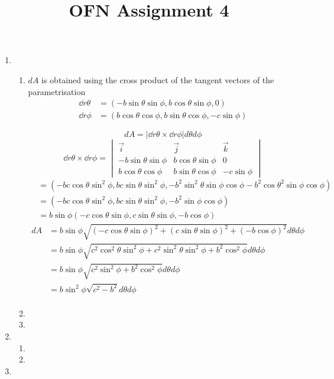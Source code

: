 \documentclass{X:/Documents/Coding/Latex/myassignment}
\title{OFN Assignment 4}
\begin{document}

\maketitle

\begin{enumerate}
\item 
\begin{enumerate}
	\item $dA$ is obtained using the cross product of the tangent vectors of the parametrisation
	\begin{align*}
		\dd r\theta &= \left(-b\sin\theta \sin\phi, b\cos\theta\sin\phi,0\right)\\
		\dd r\phi &= \left(b\cos\theta\cos\phi, b\sin\theta\cos\phi,-c\sin\phi\right)
	\end{align*}

	\[dA = \left|\dd r\theta \times \dd r\phi \right| d\theta d\phi\]
	\[\dd r\theta \times \dd r\phi= \begin{vmatrix}
		\vec i & \vec j & \vec k \\
		-b\sin\theta \sin\phi& b\cos\theta\sin\phi&0\\
		b\cos\theta\cos\phi& b\sin\theta\cos\phi&-c\sin\phi
	\end{vmatrix}\]
	\begin{align*}
		&= \left(-bc\cos\theta\sin^2\phi, bc\sin\theta\sin^2\phi, -b^2\sin^2\theta\sin\phi\cos\phi - b^2\cos\theta^2\sin\phi\cos\phi\right)\\
		&=\left(-bc\cos\theta\sin^2\phi, bc\sin\theta\sin^2\phi, -b^2\sin\phi\cos\phi\right) \\
		&= b\sin\phi\left(-c\cos\theta\sin\phi, c\sin\theta\sin\phi, -b\cos\phi\right) 
	\end{align*}
	\begin{align*}
		dA &= b\sin\phi\sqrt{(-c\cos\theta\sin\phi)^2 + (c\sin\theta\sin\phi)^2 + (-b\cos\phi)^2} d\theta d\phi\\
		&= b\sin\phi\sqrt{c^2\cos^2\theta\sin^2\phi + c^2\sin^2\theta\sin^2\phi + b^2\cos^2\phi} d\theta d\phi\\
		&= b\sin\phi\sqrt{c^2\sin^2\phi + b^2\cos^2\phi} d\theta d\phi\\
		&= b\sin^2\phi\sqrt{c^2-b^2} d\theta d\phi\\
	\end{align*}
	\item 
	\item 
\end{enumerate}

\item 
\begin{enumerate}
	\item 
	\item 
\end{enumerate}
\item 
\end{enumerate}



\end{document}
